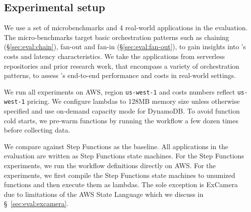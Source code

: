 


\subsection{Experimental setup}

We use a set of microbenchmarks and 4 real-world applications in the
evaluation. The micro-benchmarks target basic orchestration patterns such as
chaining (\S\ref{sec:eval:chain}), fan-out and fan-in
(\S\ref{sec:eval:fan-out}), to gain insights into \name{}'s costs and latency
characteristics. We take the applications from serverless repositories and
prior research work, that encompass a variety of orchestration patterns, to
assess \name{}'s end-to-end performance and costs in real-world settings.

We run all experiments on AWS, region \texttt{us-west-1} and costs numbers
reflect \texttt{us-west-1} pricing. We configure lambdas to 128MB memory size
unless otherwise specified and use on-demand capacity mode for DynamoDB. To
avoid function cold starts, we pre-warm functions by running the workflow a
few dozen times before collecting data.


We compare against Step Functions as the baseline. All applications in the
evaluation are written as Step Functions state machines. For the Step
Functions experiments, we run the workflow definitions directly on AWS. For
the \name{} experiments, we first compile the Step Functions state machines to
unumized functions and then execute them as lambdas. The sole exception is
ExCamera due to limitations of the AWS State Language which we discuss in
\S~\ref{sec:eval:excamera}.

